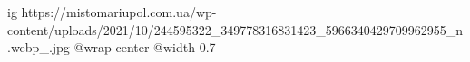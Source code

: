  
 
 
 
 

\ifcmt
  ig https://mistomariupol.com.ua/wp-content/uploads/2021/10/244595322_349778316831423_5966340429709962955_n.webp_.jpg
  @wrap center
  @width 0.7
\fi
